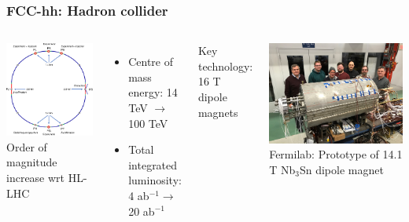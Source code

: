 \documentclass[aspectratio=169]{beamer}
\newcommand{\bluetext}[1]{%
  \textcolor{myBlue}{#1}
}
\begin{document}
\begin{frame}
  \frametitle{FCC-hh: Hadron collider}
   \begin{columns}[c]
     \includegraphics[width=1.0\linewidth]{figures/FCC_hh_ring.pdf}\\

      \bluetext{Order of magnitude increase wrt HL-LHC}
      \begin{itemize}
      \item Centre of mass energy: 14 TeV $\rightarrow$ 100 TeV
      \item Total integrated luminosity: 4 ab$^{-1} \rightarrow$ 20 ab$^{-1}$
      \end{itemize}

      \bluetext{Key technology: 16 T dipole magnets}
      \begin{center}
        \includegraphics[width=.45\linewidth]{figures/fermilab-magnets-newdipole-small.jpg}\\
         {\small{Fermilab: Prototype of 14.1 T Nb$_3$Sn dipole magnet}}
       \end{center}
   \end{columns}
\end{frame}
\end{document}
